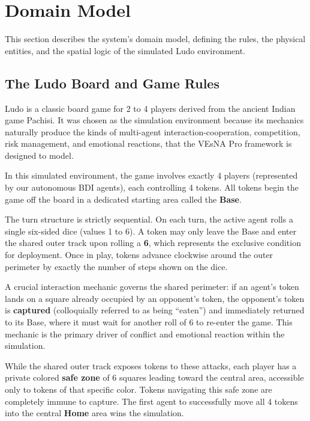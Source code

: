 \documentclass[12pt]{article}
\begin{document}
\pagebreak

\section{Domain Model}
\label{sec:intro}
\noindent This section describes the system's domain model, defining the rules, the physical entities, and the spatial logic of the simulated Ludo environment.

\subsection{The Ludo Board and Game Rules}
\label{subsec:board_rules}
\noindent Ludo is a classic board game for 2 to 4 players derived from the ancient Indian game Pachisi. 
It was chosen as the simulation environment because its
mechanics naturally produce the kinds of multi-agent interaction-cooperation,
competition, risk management, and emotional reactions, that the VEsNA Pro
framework is designed to model.


\noindent In this simulated environment, the game involves exactly 4 players (represented by our autonomous BDI agents), each controlling 4 tokens. All tokens begin the game off the board in a
dedicated starting area called the \textbf{Base}.
\linebreak

\noindent The turn structure is strictly sequential. On each turn, the active agent
rolls a single six-sided dice (values 1 to 6). A token may only leave the Base and
enter the shared outer track upon rolling a \textbf{6}, which represents the
exclusive condition for deployment. Once in play, tokens advance clockwise around
the outer perimeter by exactly the number of steps shown on the dice.

\noindent A crucial interaction mechanic governs the shared perimeter: if an
agent's token lands on a square already occupied by an opponent's token, the
opponent's token is \textbf{captured} (colloquially referred to as being
``eaten'') and immediately returned to its Base, where it must wait for another
roll of 6 to re-enter the game. This mechanic is the primary driver of conflict
and emotional reaction within the simulation.

\noindent While the shared outer track exposes tokens to these attacks, each
player has a private colored \textbf{safe zone} of 6 squares leading toward the
central area, accessible only to tokens of that specific color. Tokens navigating
this safe zone are completely immune to capture. The first agent to successfully
move all 4 tokens into the central \textbf{Home} area wins the simulation.
\end{document}
